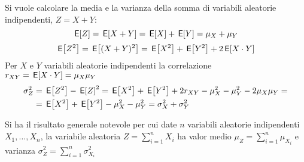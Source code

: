 \begin{esempio}
Si vuole calcolare la media e la varianza della somma di variabili aleatorie indipendenti, $Z=X+Y$:
\[\E{Z}=\E{X+Y}=\E{X}+\E{Y}=\mu_X+\mu_Y\]
\[\E{Z^2}=\E{(X+Y)^2}=\E{X^2}+\E{Y^2}+2\E{X\cdot Y}\]
Per $X$ e $Y$ variabili aleatorie indipendenti la correlazione $r_{XY}=\E{X\cdot Y}=\mu_X\mu_Y$
\[\begin{split}\sigma^2_Z&=\E{Z^2}-\E{Z}^2=\E{X^2}+\E{Y^2}+2r_{XY}-\mu^2_X-\mu^2_Y-2\mu_X\mu_Y=\\&=\E{X^2}+\E{Y^2}-\mu^2_X-\mu^2_Y=\sigma^2_X+\sigma^2_Y\end{split}\]
\end{esempio}
\begin{nota}Si ha il risultato generale notevole per cui date $n$ variabili aleatorie indipendenti $X_1,\dots,X_n$, la variabile aleatoria $Z=\sum_{i=1}^{n}X_i$ ha valor medio $\mu_Z=\sum_{i=1}^{n}\mu_{X_i}$ e varianza $\sigma^2_Z=\sum_{i=1}^{n}\sigma^2_{X_i}$
\end{nota}

